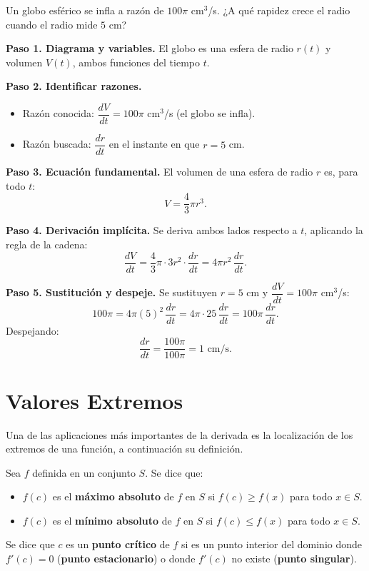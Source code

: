 \begin{example}
Un globo esférico se infla a razón de $100\pi$ cm$^3$/s.
¿A qué rapidez crece el radio cuando el radio mide $5$ cm?
\begin{myproof}
\textbf{Paso 1. Diagrama y variables.}
El globo es una esfera de radio $r(t)$ y volumen $V(t)$, ambos
funciones del tiempo $t$.

\textbf{Paso 2. Identificar razones.}
\begin{itemize}
    \item Razón conocida: $\dfrac{dV}{dt} = 100\pi$ cm$^3$/s (el globo
    se infla).
    \item Razón buscada: $\dfrac{dr}{dt}$ en el instante en que $r = 5$ cm.
\end{itemize}

\textbf{Paso 3. Ecuación fundamental.}
El volumen de una esfera de radio $r$ es, para todo $t$:
\[
V = \frac{4}{3}\pi r^3.
\]

\textbf{Paso 4. Derivación implícita.}
Se deriva ambos lados respecto a $t$, aplicando la regla de la cadena:
\[
\frac{dV}{dt} = \frac{4}{3}\pi \cdot 3r^2 \cdot \frac{dr}{dt}
              = 4\pi r^2\,\frac{dr}{dt}.
\]

\textbf{Paso 5. Sustitución y despeje.}
Se sustituyen $r = 5$ cm y $\dfrac{dV}{dt} = 100\pi$ cm$^3$/s:
\[
100\pi = 4\pi (5)^2\,\frac{dr}{dt}
       = 4\pi \cdot 25\,\frac{dr}{dt}
       = 100\pi\,\frac{dr}{dt}.
\]
Despejando:
\[
\frac{dr}{dt} = \frac{100\pi}{100\pi} = \boxed{1 \text{ cm/s.}}
\]
\end{myproof}
\end{example}
\section{Valores Extremos}
Una de las aplicaciones más importantes de la derivada es la localización de los extremos de una función, a continuación su definición.

\begin{definition}
Sea $f$ definida en un conjunto $S$. Se dice que:
\begin{itemize}
    \item $f(c)$ es el \textbf{máximo absoluto} de $f$ en $S$ si
    $f(c)\geq f(x)$ para todo $x\in S$.
    \item $f(c)$ es el \textbf{mínimo absoluto} de $f$ en $S$ si
    $f(c)\leq f(x)$ para todo $x\in S$.
    \end{itemize}
  \end{definition}
  \begin{definition} Se dice que $c$ es un \textbf{punto crítico} de $f$ si es un punto interior
    del dominio donde $f'(c)=0$ (\textbf{punto estacionario}) o donde
    $f'(c)$ no existe (\textbf{punto singular}).
\end{definition}


